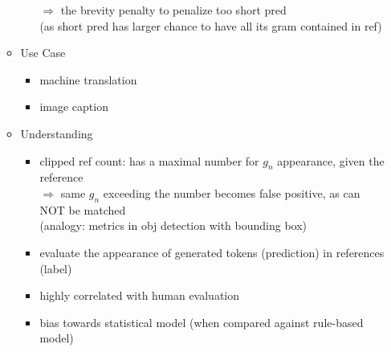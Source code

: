 \begin{itemize}
\begin{itemize}
\begin{itemize}
		$\Rightarrow$ the brevity penalty to penalize too short pred \\
		(as short pred has larger chance to have all its gram contained in ref)
		\end{itemize}
	\item Use Case
		\begin{itemize}
		\item machine translation
		\item image caption
		\end{itemize}
	\item Understanding
		\begin{itemize}
		\item clipped ref count: has a maximal number for $g_n$ appearance, given the reference\\
		$\Rightarrow$ same $g_n$ exceeding the number becomes false positive, as can NOT be matched \\
		(analogy: metrics in obj detection with bounding box)
		\item evaluate the appearance of generated tokens (prediction) in references (label)
		\item highly correlated with human evaluation
		\item bias towards statistical model (when compared against rule-based model)
		\end{itemize}
	\end{itemize}
\end{itemize}

